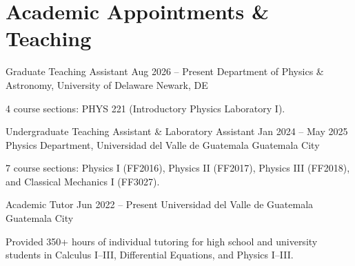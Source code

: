 \section{Academic Appointments \& Teaching}

\resumeExpEntry
    {Graduate Teaching Assistant}
    {Aug 2026 – Present}
    {Department of Physics \& Astronomy, University of Delaware}
    {Newark, DE}
    {}
    {
        \item 4 course sections: PHYS 221 (Introductory Physics Laboratory I).
    }

\resumeExpEntry
    {Undergraduate Teaching Assistant \& Laboratory Assistant}
    {Jan 2024 – May 2025}
    {Physics Department, Universidad del Valle de Guatemala}
    {Guatemala City}
    {}
    {
        \item 7 course sections: Physics I (FF2016), Physics II (FF2017), Physics III (FF2018), and Classical Mechanics I (FF3027).
    }

\resumeExpEntry
    {Academic Tutor}
    {Jun 2022 – Present}
    {Universidad del Valle de Guatemala}
    {Guatemala City}
    {}
    {
        \item Provided 350+ hours of individual tutoring for high school and university students in Calculus I–III, Differential Equations, and Physics I–III.
    }

